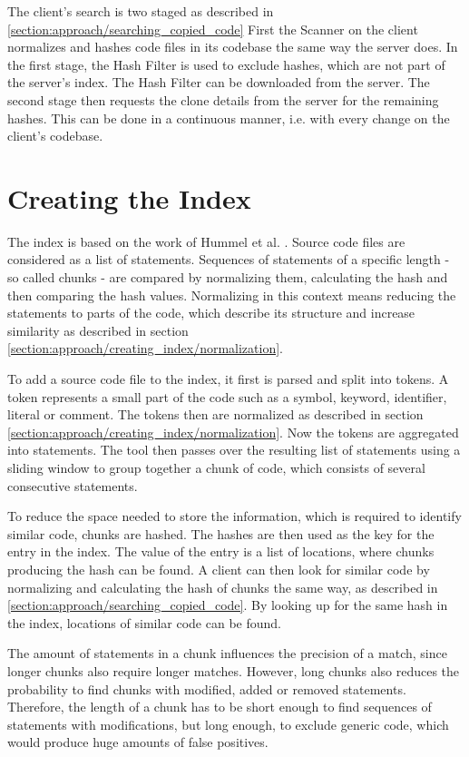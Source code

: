 The client's search is two staged as described in \autoref{section:approach/searching_copied_code}
First the Scanner on the client normalizes and hashes code files in its codebase the same way the server does.
In the first stage, the Hash Filter is used to exclude hashes, which are not part of the server's index.
The Hash Filter can be downloaded from the server.
The second stage then requests the clone details from the server for the remaining hashes.
This can be done in a continuous manner, i.e. with every change on the client's codebase.

\section{Creating the Index}\label{section:approach/creating_index}
The index is based on the work of Hummel et al. \cite{hummel2010index}.
Source code files are considered as a list of statements.
Sequences of statements of a specific length - so called chunks - are compared by normalizing them, calculating the hash and then comparing the hash values.
Normalizing in this context means reducing the statements to parts of the code, which describe its structure and increase similarity as described in section \ref{section:approach/creating_index/normalization}.

To add a source code file to the index, it first is parsed and split into tokens.
A token represents a small part of the code such as a symbol, keyword, identifier, literal or comment.
The tokens then are normalized as described in section \ref{section:approach/creating_index/normalization}.
Now the tokens are aggregated into statements.
The tool then passes over the resulting list of statements using a sliding window to group together a chunk of code, which consists of several consecutive statements. %

To reduce the space needed to store the information, which is required to identify similar code, chunks are hashed.
The hashes are then used as the key for the entry in the index.
The value of the entry is a list of locations, where chunks producing the hash can be found.
A client can then look for similar code by normalizing and calculating the hash of chunks the same way, as described in \autoref{section:approach/searching_copied_code}.
By looking up for the same hash in the index, locations of similar code can be found.

The amount of statements in a chunk influences the precision of a match, since longer chunks also require longer matches.
However, long chunks also reduces the probability to find chunks with modified, added or removed statements.
Therefore, the length of a chunk has to be short enough to find sequences of statements with modifications, but long enough, to exclude generic code, which would produce huge amounts of false positives. %

